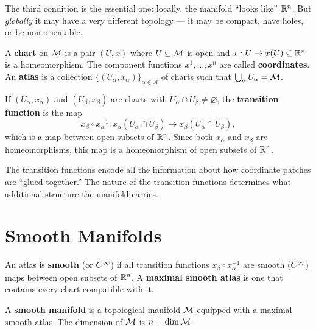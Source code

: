 The third condition is the essential one: locally, the manifold ``looks like'' $\mathbb{R}^n$. But \emph{globally} it may have a very different topology --- it may be compact, have holes, or be non-orientable.

\begin{definition}
A \textbf{chart} on $\mathcal{M}$ is a pair $(U, x)$ where $U \subseteq \mathcal{M}$ is open and $x: U \to x(U) \subseteq \mathbb{R}^n$ is a homeomorphism. The component functions $x^1, \ldots, x^n$ are called \textbf{coordinates}. An \textbf{atlas} is a collection $\{(U_\alpha, x_\alpha)\}_{\alpha \in \mathcal{A}}$ of charts such that $\bigcup_\alpha U_\alpha = \mathcal{M}$.
\end{definition}

\begin{definition}
If $(U_\alpha, x_\alpha)$ and $(U_\beta, x_\beta)$ are charts with $U_\alpha \cap U_\beta \neq \varnothing$, the \textbf{transition function} is the map
\begin{equation}
x_\beta \circ x_\alpha^{-1}: x_\alpha(U_\alpha \cap U_\beta) \to x_\beta(U_\alpha \cap U_\beta),
\end{equation}
which is a map between open subsets of $\mathbb{R}^n$. Since both $x_\alpha$ and $x_\beta$ are homeomorphisms, this map is a homeomorphism of open subsets of $\mathbb{R}^n$.
\end{definition}

The transition functions encode all the information about how coordinate patches are ``glued together.'' The nature of the transition functions determines what additional structure the manifold carries.

\section{Smooth Manifolds}

\begin{definition}
An atlas is \textbf{smooth} (or $C^{\infty}$) if all transition functions $x_\beta \circ x_\alpha^{-1}$ are smooth ($C^{\infty}$) maps between open subsets of $\mathbb{R}^n$. A \textbf{maximal smooth atlas} is one that contains every chart compatible with it.
\end{definition}

\begin{definition}
A \textbf{smooth manifold} is a topological manifold $\mathcal{M}$ equipped with a maximal smooth atlas. The dimension of $\mathcal{M}$ is $n = \dim \mathcal{M}$.
\end{definition}


